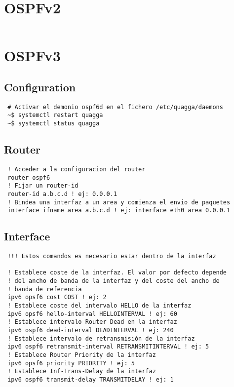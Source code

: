\documentclass{article}
\begin{document}
\section{OSPFv2}
\begin{verbatim}
\end{verbatim}

\section{OSPFv3}
\subsection{Configuration}
\begin{verbatim}
 # Activar el demonio ospf6d en el fichero /etc/quagga/daemons
 ~$ systemctl restart quagga
 ~$ systemctl status quagga
\end{verbatim}

\subsection{Router}
\begin{verbatim}
 ! Acceder a la configuracion del router
 router ospf6
 ! Fijar un router-id
 router-id a.b.c.d ! ej: 0.0.0.1
 ! Bindea una interfaz a un area y comienza el envio de paquetes
 interface ifname area a.b.c.d ! ej: interface eth0 area 0.0.0.1
\end{verbatim}

\subsection{Interface}
\begin{verbatim}
 !!! Estos comandos es necesario estar dentro de la interfaz

 ! Establece coste de la interfaz. El valor por defecto depende
 ! del ancho de banda de la interfaz y del coste del ancho de
 ! banda de referencia
 ipv6 opsf6 cost COST ! ej: 2
 ! Establece coste del intervalo HELLO de la interfaz
 ipv6 opsf6 hello-interval HELLOINTERVAL ! ej: 60
 ! Establece intervalo Router Dead en la interfaz
 ipv6 ospf6 dead-interval DEADINTERVAL ! ej: 240
 ! Establece intervalo de retransmisión de la interfaz
 ipv6 ospf6 retransmit-interval RETRANSMITINTERVAL ! ej: 5
 ! Establece Router Priority de la interfaz
 ipv6 opsf6 priority PRIORITY ! ej: 5
 ! Establece Inf-Trans-Delay de la interfaz
 ipv6 ospf6 transmit-delay TRANSMITDELAY ! ej: 1
\end{verbatim}
\end{document}
